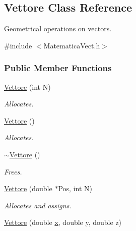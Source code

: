 \hypertarget{classVettore}{\subsection{\-Vettore \-Class \-Reference}
\label{classVettore}
}


\-Geometrical operations on vectors.  




{\ttfamily \#include $<$\-Matematica\-Vect.\-h$>$}

\subsubsection*{\-Public \-Member \-Functions}
\begin{DoxyCompactItemize}
\item 
\hypertarget{classVettore_a8be37a18dd9819f267ef0fca4770d6bf}{\hyperlink{classVettore_a8be37a18dd9819f267ef0fca4770d6bf}{\-Vettore} (int \-N)}\label{classVettore_a8be37a18dd9819f267ef0fca4770d6bf}

\begin{DoxyCompactList}\small\item\em \-Allocates. \end{DoxyCompactList}\item 
\hypertarget{classVettore_a8f9b4eac311cb366dd049eefa8d45d41}{\hyperlink{classVettore_a8f9b4eac311cb366dd049eefa8d45d41}{\-Vettore} ()}\label{classVettore_a8f9b4eac311cb366dd049eefa8d45d41}

\begin{DoxyCompactList}\small\item\em \-Allocates. \end{DoxyCompactList}\item 
\hypertarget{classVettore_a5864229515ff327ae85057b51a8035a6}{\hyperlink{classVettore_a5864229515ff327ae85057b51a8035a6}{$\sim$\-Vettore} ()}\label{classVettore_a5864229515ff327ae85057b51a8035a6}

\begin{DoxyCompactList}\small\item\em \-Frees. \end{DoxyCompactList}\item 
\hypertarget{classVettore_ab5b3efc833cf7efa62feeede44c377a5}{\hyperlink{classVettore_ab5b3efc833cf7efa62feeede44c377a5}{\-Vettore} (double $\ast$\-Pos, int \-N)}\label{classVettore_ab5b3efc833cf7efa62feeede44c377a5}

\begin{DoxyCompactList}\small\item\em \-Allocates and assigns. \end{DoxyCompactList}\item 
\hypertarget{classVettore_a4da1d1de9404fa6f377a45b6ddd36df8}{\hyperlink{classVettore_a4da1d1de9404fa6f377a45b6ddd36df8}{\-Vettore} (double \hyperlink{classVettore_a711aad4cbe735871dd9e91ab575c878b}{x}, double y, double z)}\label{classVettore_a4da1d1de9404fa6f377a45b6ddd36df8}


\end{DoxyCompactItemize}
